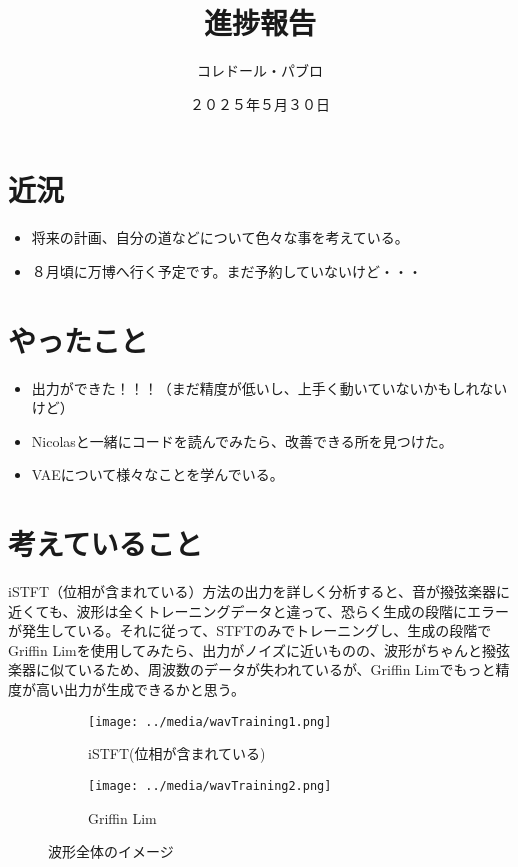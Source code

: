 \documentclass[a4paper, 12pt]{article}
\title{進捗報告}
\author{コレドール・パブロ}
\date{２０２５年５月３０日}
\begin{document}
\maketitle

\section*{近況}
\begin{itemize}
    \item 将来の計画、自分の道などについて色々な事を考えている。
    \item ８月頃に万博へ行く予定です。まだ予約していないけど・・・
\end{itemize} 

\section*{やったこと}
\begin{itemize}
    \item 出力ができた！！！（まだ精度が低いし、上手く動いていないかもしれないけど）
    \item Nicolasと一緒にコードを読んでみたら、改善できる所を見つけた。
    \item VAEについて様々なことを学んでいる。\cite{SPINVAE1} 
    
    \cite{latentSpaceInterpolation}
\end{itemize}

\section*{考えていること}

iSTFT（位相が含まれている）方法の出力を詳しく分析すると、音が撥弦楽器に近くても、波形は全くトレーニングデータと違って、恐らく生成の段階にエラーが発生している。それに従って、STFTのみでトレーニングし、生成の段階でGriffin Limを使用してみたら、出力がノイズに近いものの、波形がちゃんと撥弦楽器に似ているため、周波数のデータが失われているが、Griffin Limでもっと精度が高い出力が生成できるかと思う。

\begin{figure}
\centering
\begin{subfigure}{.5\textwidth}
  \centering
  \texttt{[image: ../media/wavTraining1.png]}
  \caption{iSTFT(位相が含まれている)}
  \label{fig:gen1}
\end{subfigure}%
\begin{subfigure}{.5\textwidth}
  \centering
  \texttt{[image: ../media/wavTraining2.png]}
  \caption{Griffin Lim}
  \label{fig:gen2}
\end{subfigure}
\caption{波形全体のイメージ}
\label{fig:generalComp}
\end{figure}
\end{document}

